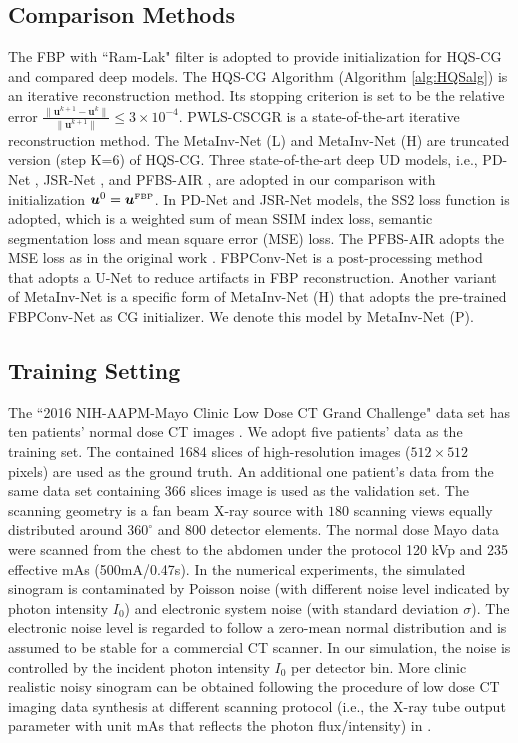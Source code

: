 \documentclass[journal,twoside]{IEEEtran}
\begin{document}
\subsection{Comparison Methods}
The FBP with ``Ram-Lak" filter is adopted to provide initialization for HQS-CG and compared deep models. The HQS-CG Algorithm (Algorithm \ref{alg:HQSalg}) is an iterative reconstruction method. Its stopping criterion is set to be the relative error $\frac{\|\bm{u}^{k+1}-\bm{u}^{k}\|}{\|\bm{u}^{k+1}\|}\le 3\times 10^{-4}$. PWLS-CSCGR \cite{bao2019convolutional} is a state-of-the-art iterative reconstruction method. The MetaInv-Net (L) and MetaInv-Net (H) are truncated version (step K=6) of HQS-CG. Three state-of-the-art deep UD models, i.e., PD-Net \cite{adler2018learned}, JSR-Net \cite{zhang2019JSRNet}, and PFBS-AIR \cite{ding2020low}, are adopted in our comparison with initialization $\bm{u}^{0}=\bm{u}^{\mbox{\tiny FBP}}$. In PD-Net and JSR-Net models, the SS2 loss function \cite{zhang2019JSRNet} is adopted, which is a weighted sum of mean SSIM index loss, semantic segmentation loss and mean square error (MSE) loss. The PFBS-AIR adopts the MSE loss as in the original work \cite{ding2020low}. FBPConv-Net \cite{Jin2017FBPConvNet} is a post-processing method that adopts a U-Net \cite{Ronneberger2015U-net} to reduce artifacts in FBP reconstruction. Another variant of MetaInv-Net is a specific form of MetaInv-Net (H) that adopts the pre-trained FBPConv-Net as CG initializer. We denote this model by MetaInv-Net (P).


\subsection{Training Setting}
The ``2016 NIH-AAPM-Mayo Clinic Low Dose CT Grand Challenge" data set has ten patients' normal dose CT images \cite{mccollough2016tu}. We adopt five patients' data as the training set. The contained 1684 slices of high-resolution images ($512\times 512$ pixels) are used as the ground truth. An additional one patient's data from the same data set containing 366 slices image is used as the validation set. The scanning geometry is a fan beam X-ray source with $180$ scanning views equally distributed around $360^{\circ}$ and 800 detector elements. The normal dose Mayo data were scanned from the chest to the abdomen under the protocol 120 kVp and 235 effective mAs (500mA/0.47s). In the numerical experiments, the simulated sinogram is contaminated by Poisson noise (with different noise level indicated by photon intensity $I_{0}$) and electronic system noise (with standard deviation $\sigma$). The electronic noise level is regarded to follow a zero-mean normal distribution and is assumed to be stable for a commercial CT scanner. In our simulation, the noise is controlled by the incident photon intensity $I_{0}$ per detector bin. More clinic realistic noisy sinogram can be obtained following the procedure of low dose CT imaging data synthesis at different scanning protocol (i.e., the X-ray tube output parameter with unit mAs that reflects the photon flux/intensity) in \cite{zeng2015simple,won2014realistic}. 
\end{document}

